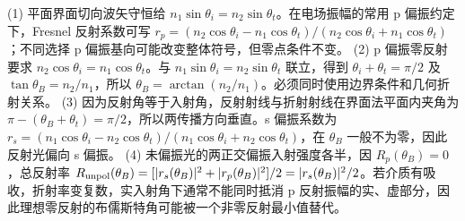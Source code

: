 (1) 平面界面切向波矢守恒给 \(n_1\sin\theta_i=n_2\sin\theta_t\)。在电场振幅的常用 p 偏振约定下，Fresnel 反射系数可写 \(r_p=(n_2\cos\theta_i-n_1\cos\theta_t)/(n_2\cos\theta_i+n_1\cos\theta_t)\)；不同选择 p 偏振基向可能改变整体符号，但零点条件不变。
(2) p 偏振零反射要求 \(n_2\cos\theta_i=n_1\cos\theta_t\)。与 \(n_1\sin\theta_i=n_2\sin\theta_t\) 联立，得到 \(\theta_i+\theta_t=\pi/2\) 及 \(\tan\theta_B=n_2/n_1\)，所以 \(\theta_B=\arctan(n_2/n_1)\)。必须同时使用边界条件和几何折射关系。
(3) 因为反射角等于入射角，反射射线与折射射线在界面法平面内夹角为 \(\pi-(\theta_B+\theta_t)=\pi/2\)，所以两传播方向垂直。s 偏振系数为 \(r_s=(n_1\cos\theta_i-n_2\cos\theta_t)/(n_1\cos\theta_i+n_2\cos\theta_t)\)，在 \(\theta_B\) 一般不为零，因此反射光偏向 s 偏振。
(4) 未偏振光的两正交偏振入射强度各半，因 \(R_p(\theta_B)=0\)，总反射率 \(R_{\rm unpol}(\theta_B)=[|r_s(\theta_B)|^2+|r_p(\theta_B)|^2]/2=|r_s(\theta_B)|^2/2\)。若介质有吸收，折射率变复数，实入射角下通常不能同时抵消 p 反射振幅的实、虚部分，因此理想零反射的布儒斯特角可能被一个非零反射最小值替代。
